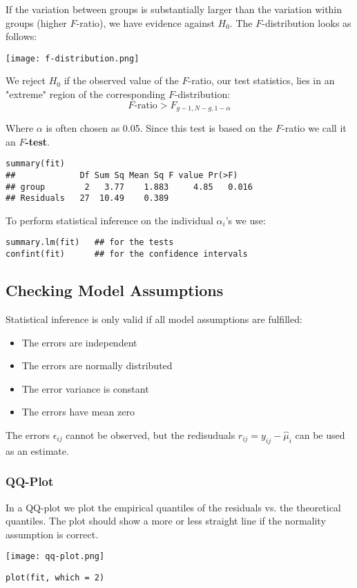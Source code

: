 If the variation between groups is substantially larger than the variation within groups (higher $F$-ratio), we have evidence against $H_0$. The $F$-distribution looks as follows:
\begin{center}
	\texttt{[image: f-distribution.png]}
\end{center}

We reject $H_0$ if the observed value of the $F$-ratio, our test statistics, lies in an "extreme" region of the corresponding $F$-distribution:
$$F \text{-ratio} > F_{g-1, N-g, 1 - \alpha}$$

Where $\alpha$ is often chosen as 0.05. Since this test is based on the $F$-ratio we call it an \textbf{$F$-test}.

\begin{lstlisting}
summary(fit)
##             Df Sum Sq Mean Sq F value Pr(>F)
## group        2   3.77    1.883     4.85   0.016
## Residuals   27  10.49    0.389
\end{lstlisting}

To perform statistical inference on the individual $\alpha_i$'s we use:
\begin{lstlisting}
summary.lm(fit)   ## for the tests
confint(fit)      ## for the confidence intervals
\end{lstlisting}


\subsection{Checking Model Assumptions}

Statistical inference is only valid if all model assumptions are fulfilled:
\begin{itemize}
	\item The errors are independent
	\item The errors are normally distributed
	\item The error variance is constant
	\item The errors have mean zero
\end{itemize}

The errors $\epsilon_{ij}$ cannot be observed, but the redisuduals $r_{ij} = y_{ij} - \hat \mu_{i}$ can be used as an estimate.

\subsubsection{QQ-Plot}

In a QQ-plot we plot the empirical quantiles of the residuals vs. the theoretical quantiles. The plot should show a more or less straight line if the normality assumption is correct.
\\[-15pt]
\begin{center}
	\texttt{[image: qq-plot.png]}
\end{center}
\begin{lstlisting}
plot(fit, which = 2)
\end{lstlisting}

